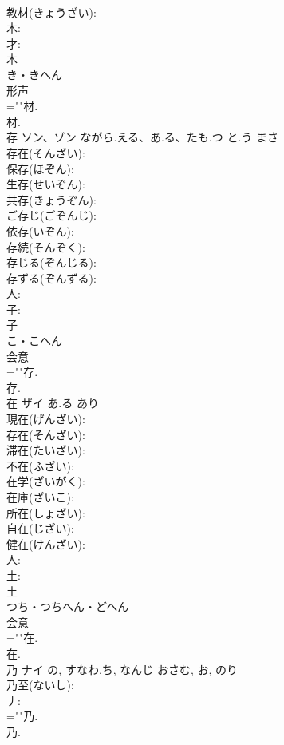 \documentclass[8pt]{extreport}
\begin{document}
\begin{CJK}{UTF8}{min}
\\	教材(きょうざい): 
\\	木: 
\\	才: 
\\	木	
\\	き・きへん	
\\	形声 
\\	=""材.
\\	材.
\\	存	ソン、ゾン	ながら.える、あ.る、たも.つ と.う	まさ	
\\	存在(そんざい): 
\\	保存(ほぞん): 
\\	生存(せいぞん): 
\\	共存(きょうぞん): 
\\	ご存じ(ごぞんじ): 
\\	依存(いぞん): 
\\	存続(そんぞく): 
\\	存じる(ぞんじる): 
\\	存ずる(ぞんずる): 
\\	人: 
\\	子: 
\\	子	
\\	こ・こへん	
\\	会意 
\\	=""存.
\\	存.
\\	在	ザイ	あ.る	あり	
\\	現在(げんざい): 
\\	存在(そんざい): 
\\	滞在(たいざい): 
\\	不在(ふざい): 
\\	在学(ざいがく): 
\\	在庫(ざいこ): 
\\	所在(しょざい): 
\\	自在(じざい): 
\\	健在(けんざい): 
\\	人: 
\\	土: 
\\	土	
\\	つち・つちへん・どへん	
\\	会意 
\\	=""在.
\\	在.
\\	乃	ナイ	の, すなわ.ち, なんじ	おさむ, お, のり	
\\	乃至(ないし): 
\\	丿: 
\\	=""乃.
\\	乃.

\end{CJK}
\end{document}
